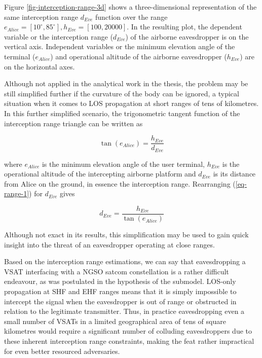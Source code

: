\documentclass[english, 12pt, a4paper, elec, utf8, a-1b, online]{aaltothesis}
\begin{document}
Figure \ref{fig-interception-range-3d} shows a three-dimensional representation of the same interception range $d_{Eve}$ function over the range $e_{Alice} = [10^\circ, 85^\circ], h_{Eve} = [100,20000]$.
In the resulting plot, the dependent variable or the interception range ($d_{Eve}$) of the airborne eavesdropper is on the vertical axis.
Independent variables or the minimum elevation angle of the terminal ($e_{Alice}$) and operational altitude of the airborne eavesdropper ($h_{Eve}$) are on the horizontal axes.

Although not applied in the analytical work in the thesis, the problem may be still simplified further if the curvature of the body can be ignored, a typical situation when it comes to LOS propagation at short ranges of tens of kilometres.
In this further simplified scenario, the trigonometric tangent function of the interception range triangle can be written as

\begin{equation} \label{eq-range-1}
  \tan(e_{Alice}) = \frac{h_{Eve}}{d_{Eve}}
\end{equation}

\noindent
where $e_{Alice}$ is the minimum elevation angle of the user terminal, $h_{Eve}$ is the operational altitude of the intercepting airborne platform and $d_{Eve}$ is its distance from Alice on the ground, in essence the interception range.
Rearranging (\ref{eq-range-1}) for $d_{Eve}$ gives

\begin{equation} \label{eq-range-2}
  d_{Eve} = \frac{h_{Eve}}{\tan(e_{Alice})}
\end{equation}

Although not exact in its results, this simplification may be used to gain quick insight into the threat of an eavesdropper operating at close ranges.

Based on the interception range estimations, we can say that eavesdropping a VSAT interfacing with a NGSO satcom constellation is a rather difficult endeavour, as was postulated in the hypothesis of the submodel.
LOS-only propagation at SHF and EHF ranges means that it is simply impossible to intercept the signal when the eavesdropper is out of range or obstructed in relation to the legitimate transmitter.
Thus, in practice eavesdropping even a small number of VSATs in a limited geographical area of tens of square kilometres would require a significant number of colluding eavesdroppers due to these inherent interception range constraints, making the feat rather impractical for even better resourced adversaries.
\end{document}
